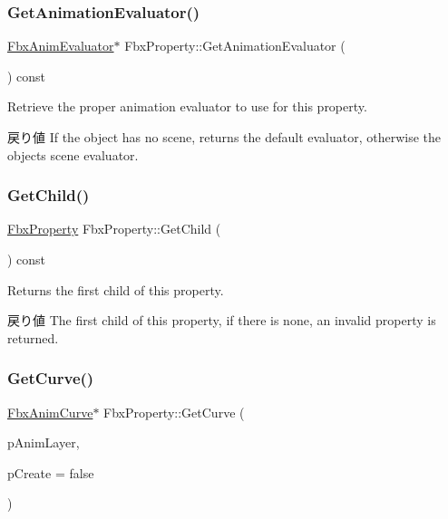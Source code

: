 \mbox{\label{class_fbx_property_adcf2ea55a226994e1545b6179b33cbb2}} 
\subsubsection{\texorpdfstring{Get\+Animation\+Evaluator()}{GetAnimationEvaluator()}}
{\footnotesize\ttfamily \hyperlink{class_fbx_anim_evaluator}{Fbx\+Anim\+Evaluator}$\ast$ Fbx\+Property\+::\+Get\+Animation\+Evaluator (\begin{DoxyParamCaption}{ }\end{DoxyParamCaption}) const}

Retrieve the proper animation evaluator to use for this property. \begin{DoxyReturn}{戻り値}
If the object has no scene, returns the default evaluator, otherwise the object\textquotesingle{}s scene evaluator. 
\end{DoxyReturn}
\mbox{\label{class_fbx_property_a0b677f1fd948cfc645962a91b1ed928f}} 
\subsubsection{\texorpdfstring{Get\+Child()}{GetChild()}}
{\footnotesize\ttfamily \hyperlink{class_fbx_property}{Fbx\+Property} Fbx\+Property\+::\+Get\+Child (\begin{DoxyParamCaption}{ }\end{DoxyParamCaption}) const}

Returns the first child of this property. \begin{DoxyReturn}{戻り値}
The first child of this property, if there is none, an invalid property is returned. 
\end{DoxyReturn}
\mbox{\label{class_fbx_property_a78b7ee36876a91b8689caae3117cbbb0}} 
\subsubsection{\texorpdfstring{Get\+Curve()}{GetCurve()}\hspace{0.1cm}{\footnotesize\ttfamily [1/3]}}
{\footnotesize\ttfamily \hyperlink{class_fbx_anim_curve}{Fbx\+Anim\+Curve}$\ast$ Fbx\+Property\+::\+Get\+Curve (\begin{DoxyParamCaption}\item[{\hyperlink{class_fbx_anim_layer}{Fbx\+Anim\+Layer} $\ast$}]{p\+Anim\+Layer,  }\item[{bool}]{p\+Create = {\ttfamily false} }\end{DoxyParamCaption})}

